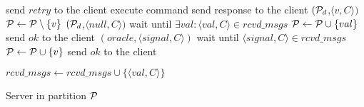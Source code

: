 \begin{algorithm}[t!]
\small

\begin{distribalgo}[1]


%
			\STATE send $retry$ to the client
		\ELSE
			\STATE execute command
			\STATE send response to the client
		\ENDIF
	\ENDINDENT
        \vspace{1.0mm}
				\STATE \rmcast$(\mathcal{P}_d$,$\langle v, C \rangle)$
				\STATE $\mathcal{P} \leftarrow \mathcal{P} \setminus \{v\}$
				\STATE \rmcast$(\mathcal{P}_d$,$\langle null, C \rangle)$
			\ENDIF
			\STATE wait until $\exists val : \langle val, C \rangle \in rcvd\_msgs$
				\STATE $\mathcal{P} \leftarrow \mathcal{P} \cup \{val\}$
			\ENDIF
		\ENDIF
		\STATE send $ok$ to the client
        	\ENDINDENT
	\vspace{1.0mm}
		\STATE \rmcast$(oracle, \langle signal, C \rangle )$
		\STATE wait until $\langle signal, C \rangle \in rcvd\_msgs$
		\STATE $\mathcal{P} \leftarrow \mathcal{P} \cup \{v\}$
		\STATE send $ok$ to the client
        	\ENDINDENT

    \vspace{1.0mm}

        \STATE $rcvd\_msgs \leftarrow rcvd\_msgs \cup \{\langle val, C \rangle\}$
    \ENDINDENT


\caption{Server in partition $\mathcal{P}$}
\label{alg:server_proxy}
\end{distribalgo}
\end{algorithm}